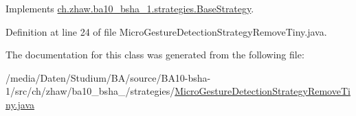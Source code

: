 Implements \hyperlink{classch_1_1zhaw_1_1ba10__bsha__1_1_1strategies_1_1BaseStrategy_a0496e8fd0099a5f0f7765322d7e752a9}{ch.zhaw.ba10\_\-bsha\_\-1.strategies.BaseStrategy}.

Definition at line 24 of file MicroGestureDetectionStrategyRemoveTiny.java.

The documentation for this class was generated from the following file:\begin{DoxyCompactItemize}
\item 
/media/Daten/Studium/BA/source/BA10-\/bsha-\/1/src/ch/zhaw/ba10\_\-bsha\_/strategies/\hyperlink{MicroGestureDetectionStrategyRemoveTiny_8java}{MicroGestureDetectionStrategyRemoveTiny.java}\end{DoxyCompactItemize}
